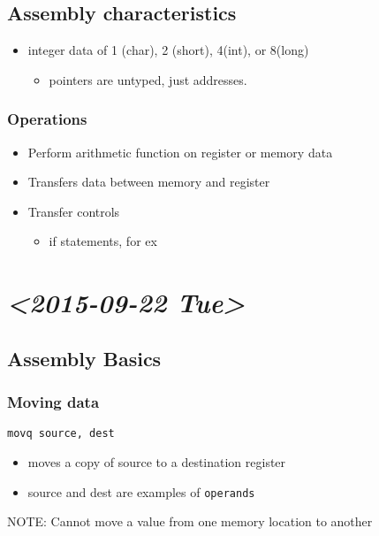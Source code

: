 \documentclass[11pt]{article}
\begin{document}
\subsection{Assembly characteristics}
\label{sec-5-6}
\begin{itemize}
\item integer data of 1 (char), 2 (short), 4(int), or 8(long)
\begin{itemize}
\item pointers are untyped, just addresses.
\end{itemize}
\end{itemize}
\subsubsection{Operations}
\label{sec-5-6-1}
\begin{itemize}
\item Perform arithmetic function on register or memory data
\item Transfers data between memory and register
\item Transfer controls
\begin{itemize}
\item if statements, for ex
\end{itemize}
\end{itemize}
\section{\textit{<2015-09-22 Tue>}}
\label{sec-6}
\subsection{Assembly Basics}
\label{sec-6-1}
\subsubsection{Moving data}
\label{sec-6-1-1}
\texttt{movq source, dest} 
\begin{itemize}
\item moves a copy of source to a destination register
\item source and dest are examples of \texttt{operands}
\end{itemize}
NOTE: Cannot move a value from one memory location to another
\end{document}
